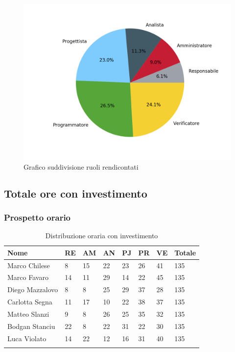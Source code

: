 \begin{figure}[H]
	\centering
  		\includegraphics[width=0.8\linewidth]{./images/torta_to.png}
  		\caption{Grafico suddivisione ruoli rendicontati}
  		\label{fig:grafico suddivione ruoli}
\end{figure}



\subsection{Totale ore con investimento}
\subsubsection{Prospetto orario}


\begin{longtable}{|C{.30\textwidth}|C{.06\textwidth}|C{.06\textwidth}|C{.06\textwidth} | C{.06\textwidth}| C{.06\textwidth} | C{.06\textwidth} | C{.10\textwidth} |}
\hline
\textbf{Nome} & \textbf{RE} & \textbf{AM} & \textbf{AN} & \textbf{PJ} & \textbf{PR} & \textbf{VE} & \textbf{Totale}\\
\hline 
Marco Chilese & 8 & 15 & 22 & 23 & 26 & 41 & 135\\
\hline
Marco Favaro & 14 & 11 & 29 & 14 & 22 & 45 & 135\\
\hline
Diego Mazzalovo & 8 & 8 & 25 & 29 & 37 & 28 & 135\\
\hline
Carlotta Segna & 11 & 17 & 10 & 22 & 38 & 37 & 135\\
\hline
Matteo Slanzi & 9 & 8 & 26 & 25 & 35 & 32 & 135\\
\hline
Bodgan Stanciu & 22 & 8 & 22 & 31 & 22 & 30 & 135\\
\hline
Luca Violato & 14 & 22 & 12 & 16 & 31 & 40 & 135 \\
\hline


\caption{Distribuzione oraria con investimento}
\label{Distribuzione oraria delle ore con investimento}
\end{longtable}


